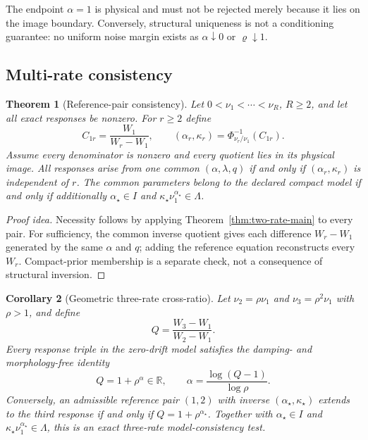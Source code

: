 \documentclass[11pt]{article}
\newtheorem{theorem}{Theorem}[section]
\newtheorem{corollary}[theorem]{Corollary}
\theoremstyle{definition}
\theoremstyle{remark}
\newcommand{\R}{\mathbb R}
\begin{document}
The endpoint $\alpha=1$ is physical and must not be rejected merely because
it lies on the image boundary.  Conversely, structural uniqueness is not a
conditioning guarantee: no uniform noise margin exists as
$\alpha\downarrow0$ or $\varrho\downarrow1$.

\subsection{Multi-rate consistency}

\begin{theorem}[Reference-pair consistency]
\label{thm:multirate-main}
Let $0<\nu_1<\cdots<\nu_R$, $R\ge2$, and let all exact responses be nonzero.
For $r\ge2$ define
\[
 C_{1r}=\frac{W_1}{W_r-W_1},\qquad
 (\alpha_r,\kappa_r)=\Phi_{\nu_r/\nu_1}^{-1}(C_{1r}).
\]
Assume every denominator is nonzero and every quotient lies in its physical
image.  All responses arise from one common $(\alpha,\lambda,q)$ if and only
if $(\alpha_r,\kappa_r)$ is independent of $r$.  The common parameters belong
to the declared compact model if and only if additionally
$\alpha_\star\in I$ and
$\kappa_\star\nu_1^{\alpha_\star}\in\Lambda$.
\end{theorem}

\begin{proof}[Proof idea]
Necessity follows by applying Theorem~\ref{thm:two-rate-main} to every pair.
For sufficiency, the common inverse quotient gives each difference
$W_r-W_1$ generated by the same $\alpha$ and $q$; adding the reference
equation reconstructs every $W_r$.  Compact-prior membership is a separate
check, not a consequence of structural inversion.
\end{proof}

\begin{corollary}[Geometric three-rate cross-ratio]
\label{cor:three-rate-main}
Let $\nu_2=\rho\nu_1$ and $\nu_3=\rho^2\nu_1$ with $\rho>1$, and define
\[
 Q=\frac{W_3-W_1}{W_2-W_1}.
\]
Every response triple in the zero-drift model satisfies the damping- and
morphology-free identity
\begin{equation}
 Q=1+\rho^\alpha\in\R,
 \qquad
 \alpha=\frac{\log(Q-1)}{\log\rho}.
 \label{eq:three-rate-main}
\end{equation}
Conversely, an admissible reference pair $(1,2)$ with inverse
$(\alpha_\star,\kappa_\star)$ extends to the third response if and only if
$Q=1+\rho^{\alpha_\star}$.  Together with
$\alpha_\star\in I$ and
$\kappa_\star\nu_1^{\alpha_\star}\in\Lambda$, this is an exact three-rate
model-consistency test.
\end{corollary}
\end{document}
